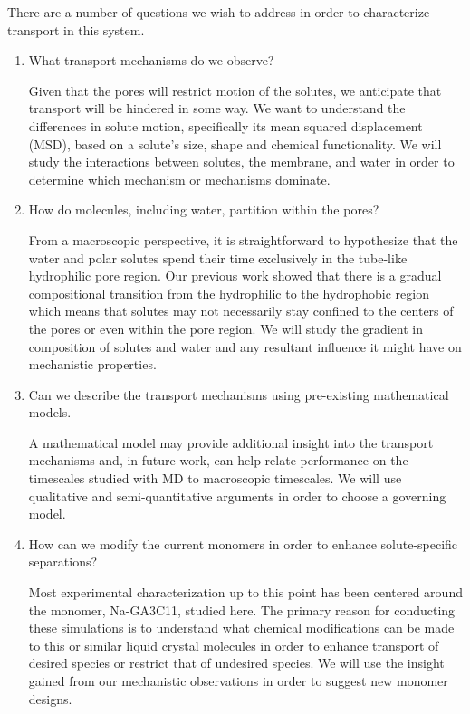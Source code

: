 \documentclass{article}
\begin{document}
  \noindent There are a number of questions we wish to address in order to characterize
  transport in this system.
  \begin{enumerate}
  
   	\item What transport mechanisms do we observe? \label{question:mechanisms}
  	
  	Given that the pores will restrict motion of the solutes, we anticipate that 
  	transport will be hindered in some way. We want to understand the differences in
  	solute motion, specifically its mean squared displacement (MSD), based on a solute's
  	size, shape and chemical functionality. We will study the interactions
  	between solutes, the membrane, and water in order to determine which mechanism
  	or mechanisms dominate.
  
  	\item How do molecules, including water, partition within the pores? \label{question:partition}
  	
  	From a macroscopic perspective, it is straightforward to hypothesize that the water and
  	polar solutes spend their time exclusively in the tube-like hydrophilic pore region.
  	Our previous work showed that there is a gradual compositional transition from the 
  	hydrophilic to the hydrophobic region which means that solutes may not 
  	necessarily stay confined to the centers of the pores or even within the
  	pore region. We will study the gradient in composition of solutes and water
  	and any resultant influence it might have on mechanistic properties.
  	
  	\item Can we describe the transport mechanisms using pre-existing 
  	mathematical models. \label{question:math}
  	
  	A mathematical model may provide additional insight into the transport
  	mechanisms and, in future work, can help relate performance on the 
  	timescales studied with MD to macroscopic timescales. We will use
  	qualitative and semi-quantitative arguments in order to choose a 
  	governing model. 
  	
  	\item How can we modify the current monomers in order to enhance
  	solute-specific separations? \label{question:math}
  	
  	Most experimental characterization up to this point has been centered 
  	around the monomer, Na-GA3C11, studied here. The primary reason for conducting
  	these simulations is to understand what chemical modifications can be made 
  	to this or similar liquid crystal molecules in order to enhance transport 
  	of desired species or restrict that of undesired species. We will use the 
  	insight gained from our mechanistic observations in order to suggest new 
  	monomer designs.
  	
  \end{enumerate} 
  
\end{document}
